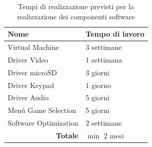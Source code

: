 \documentclass[a4paper]{article}
\begin{document}
\begin{center}
\begin{table}[h]
    \centering
    \begin{tabular}{|l|l|}
        \hline
        \textbf{Nome}                         & \textbf{Tempo di lavoro}  \\ \hline
        Virtual Machine                       & 3 settimane     \\ \hline
        Driver Video                          & 1 settimana     \\ \hline
        Driver microSD                        & 3 giorni        \\ \hline
        Driver Keypad                         & 1 giorno        \\ \hline
        Driver Audio                          & 5 giorni        \\ \hline
        Men\'{u} Game Selection               & 5 giorni        \\ \hline
        Software Optimization                 & 2 settimane     \\ \hline
        \multicolumn{1}{|r|}{\textbf{Totale}} & $\min$ 2 mesi   \\ \hline
    \end{tabular}
    \caption{
        Tempi di realizzazione previsti per la realizzazione dei componenti software
    }
\end{table}

\end{center}
\end{document}
